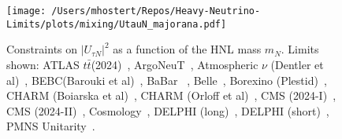 \documentclass{revtex4-1}%
\begin{document}
%


\begin{figure}[h!]%
\centering%
\texttt{[image: /Users/mhostert/Repos/Heavy-Neutrino-Limits/plots/mixing/UtauN\_majorana.pdf]}%
\caption{Constraints on $|U_{\tau N}|^2$ as a function of the HNL mass $m_N$. Limits shown: ATLAS $t\bar t$(2024)~\cite{ATLAS:2024fcs}, ArgoNeuT~\cite{ArgoNeuT:2021clc}, Atmospheric $\nu$ (Dentler et al)~\cite{Dentler:2018sju}, BEBC(Barouki et al)~\cite{Barouki:2022bkt}, BaBar ~\cite{BaBar:2022cqj}, Belle~\cite{Belle:2024wyk}, Borexino (Plestid)~\cite{Plestid:2020ssy}, CHARM (Boiarska et al)~\cite{Boiarska:2021yho}, CHARM (Orloff et al)~\cite{Orloff:2002de}, CMS (2024-I)~\cite{CMS:2024ake}, CMS (2024-II)~\cite{CMS:2024xdq}, Cosmology~\cite{Sabti:2020yrt}, DELPHI (long)~\cite{DELPHI:1996qcc}, DELPHI (short)~\cite{DELPHI:1996qcc}, PMNS Unitarity~\cite{Blennow:2023mqx}.}%
\end{figure}

%
%
%
\end{document}
